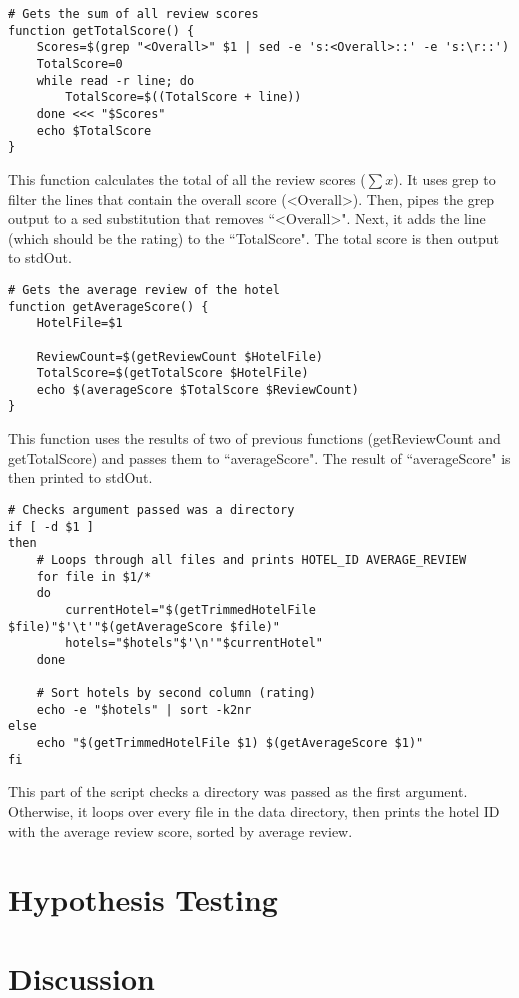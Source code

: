 \documentclass[a4paper]{article}
\begin{document}
\begin{lstlisting}
# Gets the sum of all review scores
function getTotalScore() {
	Scores=$(grep "<Overall>" $1 | sed -e 's:<Overall>::' -e 's:\r::')
	TotalScore=0
	while read -r line; do
		TotalScore=$((TotalScore + line))
	done <<< "$Scores"
	echo $TotalScore
}
\end{lstlisting}
This function calculates the total of all the review scores ($\sum x$).
It uses grep to filter the lines that contain the overall score (\textless Overall\textgreater).
Then, pipes the grep output to a sed substitution that removes ``\textless Overall\textgreater".
Next, it adds the line (which should be the rating) to the ``TotalScore".
The total score is then output to stdOut.

\begin{lstlisting}
# Gets the average review of the hotel
function getAverageScore() {
	HotelFile=$1
	
	ReviewCount=$(getReviewCount $HotelFile)
	TotalScore=$(getTotalScore $HotelFile)
	echo $(averageScore $TotalScore $ReviewCount)
}
\end{lstlisting}
This function uses the results of two of previous functions (getReviewCount and getTotalScore) and passes them to ``averageScore".
The result of ``averageScore" is then printed to stdOut.

\begin{lstlisting}
# Checks argument passed was a directory
if [ -d $1 ]
then
	# Loops through all files and prints HOTEL_ID AVERAGE_REVIEW
	for file in $1/*
	do
		currentHotel="$(getTrimmedHotelFile $file)"$'\t'"$(getAverageScore $file)"
		hotels="$hotels"$'\n'"$currentHotel"
	done
	
	# Sort hotels by second column (rating)
	echo -e "$hotels" | sort -k2nr
else
	echo "$(getTrimmedHotelFile $1) $(getAverageScore $1)"
fi
\end{lstlisting}
This part of the script checks a directory was passed as the first argument.
Otherwise, it loops over every file in the data directory, then prints the hotel ID with the average review score, sorted by average review.


\newpage
\section{Hypothesis Testing}

\newpage
\section{Discussion}
\end{document}
